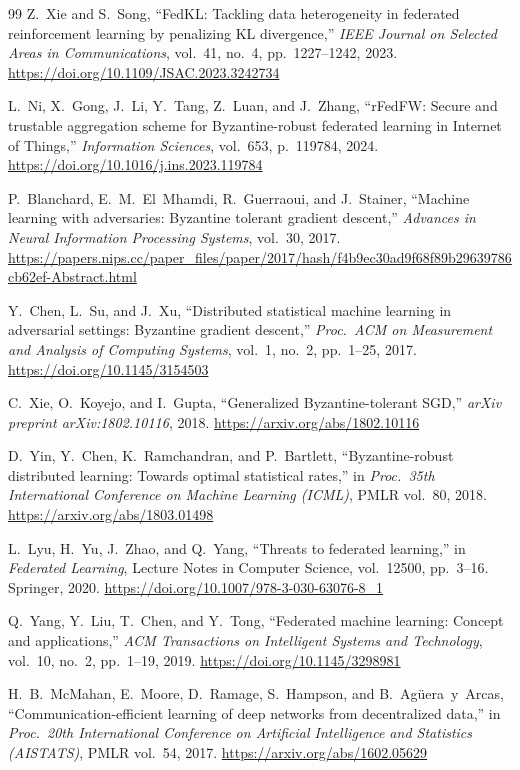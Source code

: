 \documentclass[12pt,a4paper]{article}
\begin{document}
\begin{thebibliography}{99}
Z.~Xie and S.~Song,
``FedKL: Tackling data heterogeneity in federated reinforcement learning by penalizing
KL divergence,''
\textit{IEEE Journal on Selected Areas in Communications}, vol.~41, no.~4,
pp.~1227--1242, 2023.
\url{https://doi.org/10.1109/JSAC.2023.3242734}

L.~Ni, X.~Gong, J.~Li, Y.~Tang, Z.~Luan, and J.~Zhang,
``rFedFW: Secure and trustable aggregation scheme for Byzantine-robust federated
learning in Internet of Things,''
\textit{Information Sciences}, vol.~653, p.~119784, 2024.
\url{https://doi.org/10.1016/j.ins.2023.119784}

P.~Blanchard, E.~M.~El~Mhamdi, R.~Guerraoui, and J.~Stainer,
``Machine learning with adversaries: Byzantine tolerant gradient descent,''
\textit{Advances in Neural Information Processing Systems}, vol.~30, 2017.
\url{https://papers.nips.cc/paper_files/paper/2017/hash/f4b9ec30ad9f68f89b29639786cb62ef-Abstract.html}

Y.~Chen, L.~Su, and J.~Xu,
``Distributed statistical machine learning in adversarial settings: Byzantine gradient
descent,''
\textit{Proc.\ ACM on Measurement and Analysis of Computing Systems}, vol.~1, no.~2,
pp.~1--25, 2017.
\url{https://doi.org/10.1145/3154503}

C.~Xie, O.~Koyejo, and I.~Gupta,
``Generalized Byzantine-tolerant SGD,''
\textit{arXiv preprint arXiv:1802.10116}, 2018.
\url{https://arxiv.org/abs/1802.10116}

D.~Yin, Y.~Chen, K.~Ramchandran, and P.~Bartlett,
``Byzantine-robust distributed learning: Towards optimal statistical rates,''
in \textit{Proc.\ 35th International Conference on Machine Learning (ICML)},
PMLR vol.~80, 2018.
\url{https://arxiv.org/abs/1803.01498}

L.~Lyu, H.~Yu, J.~Zhao, and Q.~Yang,
``Threats to federated learning,''
in \textit{Federated Learning}, Lecture Notes in Computer Science, vol.~12500,
pp.~3--16. Springer, 2020.
\url{https://doi.org/10.1007/978-3-030-63076-8_1}

Q.~Yang, Y.~Liu, T.~Chen, and Y.~Tong,
``Federated machine learning: Concept and applications,''
\textit{ACM Transactions on Intelligent Systems and Technology}, vol.~10, no.~2,
pp.~1--19, 2019.
\url{https://doi.org/10.1145/3298981}

H.~B.~McMahan, E.~Moore, D.~Ramage, S.~Hampson, and B.~Ag\"{u}era~y~Arcas,
``Communication-efficient learning of deep networks from decentralized data,''
in \textit{Proc.\ 20th International Conference on Artificial Intelligence and
Statistics (AISTATS)}, PMLR vol.~54, 2017.
\url{https://arxiv.org/abs/1602.05629}


\end{thebibliography}
\end{document}
